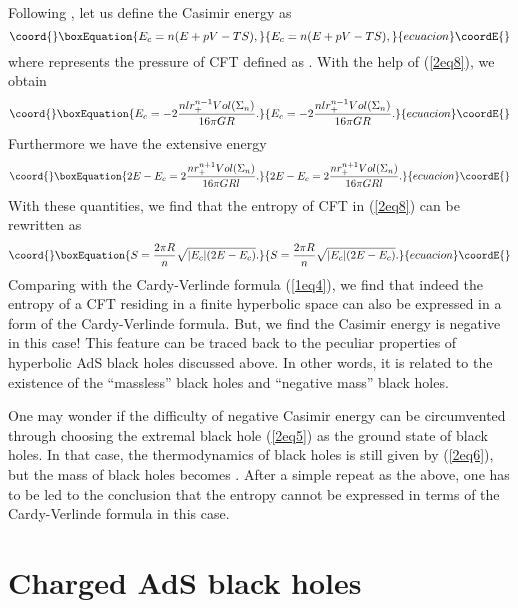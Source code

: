 \documentclass[a4paper,12pt]{article}
\providecommand{\sect}[1]{\setcounter{equation}{0}\section{#1}}
\begin{document}
Following \cite{Verl}, let us define the Casimir energy \coordHE{} as
\begin{equation}\coord{}\boxEquation{
\label{2eq9}
E_c= n(E+pV -TS),
}{
E_c= n(E+pV -TS),
}{ecuacion}\coordE{}\end{equation}
where \coordHE{} represents the pressure of CFT defined as \coordHE{}. With the help of (\ref{2eq8}), we obtain 
\begin{equation}\coord{}\boxEquation{
\label{2eq10}
E_c= -2 \frac{nlr_+^{n-1}Vol(\Sigma_n)}{16\pi GR}.
}{
E_c= -2 \frac{nlr_+^{n-1}Vol(\Sigma_n)}{16\pi GR}.
}{ecuacion}\coordE{}\end{equation}
Furthermore we have the extensive energy  
\begin{equation}\coord{}\boxEquation{
\label{2eq11}
2E-E_c =2\frac{n r_+^{n+1} Vol(\Sigma_n)}{16\pi GR l}.   
}{
2E-E_c =2\frac{n r_+^{n+1} Vol(\Sigma_n)}{16\pi GR l}.   
}{ecuacion}\coordE{}\end{equation}
With these quantities, we find that the entropy \coordHE{} of CFT in (\ref{2eq8}) 
can be rewritten as
\begin{equation}\coord{}\boxEquation{
\label{2eq12}
S =\frac{2\pi R}{n}\sqrt{|E_c|(2E-E_c)}.
}{
S =\frac{2\pi R}{n}\sqrt{|E_c|(2E-E_c)}.
}{ecuacion}\coordE{}\end{equation}
Comparing with the Cardy-Verlinde formula (\ref{1eq4}), we find that indeed
the entropy of a CFT residing in a finite hyperbolic space can also be 
expressed in a form of the Cardy-Verlinde formula. But,
we find the Casimir energy is negative in this case! This feature can be 
traced back to the peculiar properties of hyperbolic AdS black holes 
discussed above. In other words, it is related to the existence of the
 ``massless'' black holes and ``negative mass'' black holes.    

   
One may wonder if the difficulty of negative Casimir energy can be 
circumvented through choosing the extremal black hole (\ref{2eq5}) as
the ground state of black holes. In that case, the thermodynamics of black 
holes is still given by (\ref{2eq6}), but the mass of black holes becomes
\coordHE{}. After a simple repeat as the above, one has to be led to 
the conclusion that the entropy cannot be expressed in terms of the 
Cardy-Verlinde formula in this case.  



\sect{Charged AdS black holes }
\end{document}
